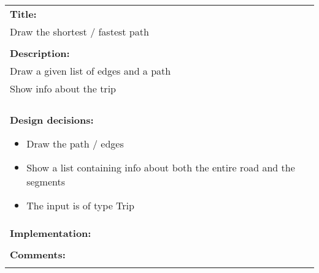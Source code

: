 \begin{tabular}{ | p{12cm} | }
	\hline
	\textbf{Title:} \\
	Draw the shortest / fastest path \\
	\\ \hline
	\textbf{Description:} \\
	Draw a given list of edges and a path \\
	Show info about the trip \\
	\\ \hline
	\textbf{Design decisions:}
	\begin{itemize}
		\item Draw the path / edges
		\item Show a list containing info about both the entire road and the segments
		\item The input is of type Trip
	\end{itemize}
	\\ \hline
	\textbf{Implementation:} \\
	\\ \hline
	\textbf{Comments:} \\
	\\ \hline
\end{tabular}

\pagebreak

